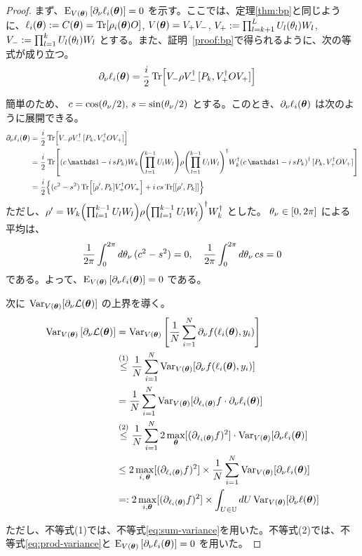 \begin{proof}\label{proof:qml-upper-var}
    まず、$\operatorname{E}_{V(\boldsymbol{\theta})}\qty[\partial_\nu \ell_i(\boldsymbol{\theta})] = 0$ を示す。ここでは、定理\ref{thm:bp}と同じように、$\ell_i(\boldsymbol{\theta}) := C(\boldsymbol{\theta}) = \Tr[\rho_i(\boldsymbol{\theta})O]$, $V(\boldsymbol{\theta}) = V_+V_-$, $V_+ := \prod_{l=k+1}^L U_l(\theta_l)W_l$, $V_- := \prod_{l=1}^{k} U_l(\theta_l)W_l$ とする。また、証明~\ref{proof:bp}で得られるように、次の等式が成り立つ。
    \begin{align}
        \partial_\nu \ell_i(\boldsymbol{\theta})
        &=\frac{i}{2}\Tr[V_-\rho V_-^\dagger\, [P_k, V_+^\dagger OV_+]]
    \end{align}
    
    簡単のため、 $c = \cos(\theta_\nu/2),\, s = \sin(\theta_\nu/2)$ とする。このとき、$\partial_\nu \ell_i(\boldsymbol{\theta})$ は次のように展開できる。
    \begin{align}
        \pd_\nu \ell_i(\bs{\th})
        &= \frac{i}{2}\Tr[V_-\rho V_-\dg\, [P_k, V_+\dg OV_+]]\\
        &= \frac{i}{2}\Tr[\qty(c\,\bbid - i\,sP_k)W_k\qty(\prod_{l=1}^{k-1}U_lW_l)\rho \qty(\prod_{l=1}^{k-1}U_lW_l)\dg W_k\dg\qty(c\,\bbid - i\,sP_k)\dg\, [P_k, V_+\dg OV_+]]\\
        &= \frac{i}{2}\qty{(c^2-s^2)\Tr[[\rho^\prime, P_k]V_+\dg OV_+] + i\,cs\Tr[[\rho^\prime, P_k]]}
    \end{align}
    ただし、$\rho^\prime = W_k\qty(\prod_{l=1}^{k-1}U_lW_l)\rho \qty(\prod_{l=1}^{k-1}U_lW_l)^\dagger W_k^\dagger$ とした。
    $\theta_\nu \in [0,2\pi]$ による平均は、
    \begin{align}
        \frac{1}{2\pi}\int_0^{2\pi} d\theta_\nu\, (c^2-s^2) = 0, \quad
        \frac{1}{2\pi}\int_0^{2\pi} d\theta_\nu\, cs = 0
    \end{align}
    である。よって、$\operatorname{E}_{V(\boldsymbol{\theta})}\qty[\partial_\nu \ell_i(\boldsymbol{\theta})] = 0$ である。
    
    次に $\operatorname{Var}_{V(\boldsymbol{\theta})}[\partial_\nu \mathcal{L}(\boldsymbol{\theta})]$ の上界を導く。
    \begin{align}
        \operatorname{Var}_{V(\boldsymbol{\theta})}\qty[\partial_\nu \mathcal{L}(\boldsymbol{\theta})]
        &= \operatorname{Var}_{V(\boldsymbol{\theta})}\qty[\frac1N\sum_{i=1}^N \partial_\nu f(\ell_i(\boldsymbol{\theta}),y_i)]\\
        &\overset{(1)}{\leq} \frac1N\sum_{i=1}^N \operatorname{Var}_{V(\boldsymbol{\theta})}[\partial_\nu f(\ell_i(\boldsymbol{\theta}),y_i)]\\
        &= \frac1N\sum_{i=1}^N \operatorname{Var}_{V(\boldsymbol{\theta})}[\partial_{\ell_i(\boldsymbol{\theta})}f \cdot \partial_\nu \ell_i(\boldsymbol{\theta})]\\
        &\overset{(2)}{\leq} \frac1N\sum_{i=1}^N 2\max_{\boldsymbol{\theta}}[(\partial_{\ell_i(\boldsymbol{\theta})}f)^2] \cdot \operatorname{Var}_{V(\boldsymbol{\theta})}[\partial_\nu \ell_i(\boldsymbol{\theta})]\\
        &\leq 2\max_{i,\,\boldsymbol{\theta}}[(\partial_{\ell_i(\boldsymbol{\theta})}f)^2] \times \frac1N\sum_{i=1}^N \operatorname{Var}_{V(\boldsymbol{\theta})}[\partial_\nu \ell_i(\boldsymbol{\theta})]\\
        &=: 2\max_{i,\boldsymbol{\theta}} [(\partial_{\ell_i(\boldsymbol{\theta})}f)^2]
        \times \int_{U\in\mathbb{U}} dU \operatorname{Var}_{V(\boldsymbol{\theta})}[\partial_\nu \ell(\boldsymbol{\theta})]
    \end{align}
    
    ただし、不等式(1)では、不等式\eqref{eq:sum-variance}を用いた。不等式(2)では、不等式\eqref{eq:prod-variance}と $\operatorname{E}_{V(\boldsymbol{\theta})}\qty[\partial_\nu \ell_i(\boldsymbol{\theta})] = 0$ を用いた。
\end{proof}


